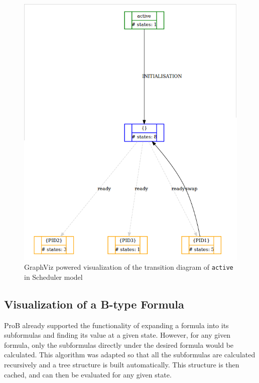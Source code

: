 \begin{center}
\begin{figure}[h!]
\centering
\includegraphics[width=14cm]{bilder/transdiag-dotty-wo.png}
\caption{GraphViz powered visualization of the transition diagram of \texttt{active} in Scheduler model}
\label{transdiagDotty}
\end{figure}
\end{center}

\subsection{Visualization of a B-type Formula}

ProB already supported the functionality of expanding a formula into its subformulas and finding its value at a given state. However, for any given formula, only the subformulas directly under the desired formula would be calculated. This algorithm was adapted so that all the subformulas are calculated recursively and a tree structure is built automatically. This structure is then cached, and can then be evaluated for any given state. 


